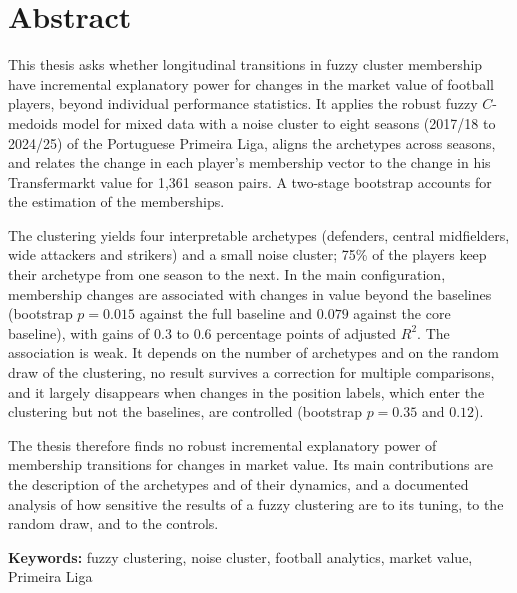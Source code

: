 \chapter*{Abstract}

This thesis asks whether longitudinal transitions in fuzzy cluster membership have incremental explanatory power for changes in the market value of football players, beyond individual performance statistics. It applies the robust fuzzy $C$-medoids model for mixed data with a noise cluster to eight seasons (2017/18 to 2024/25) of the Portuguese Primeira Liga, aligns the archetypes across seasons, and relates the change in each player's membership vector to the change in his Transfermarkt value for 1,361 season pairs. A two-stage bootstrap accounts for the estimation of the memberships.

The clustering yields four interpretable archetypes (defenders, central midfielders, wide attackers and strikers) and a small noise cluster; 75\% of the players keep their archetype from one season to the next. In the main configuration, membership changes are associated with changes in value beyond the baselines (bootstrap $p=0.015$ against the full baseline and $0.079$ against the core baseline), with gains of 0.3 to 0.6 percentage points of adjusted $R^2$. The association is weak. It depends on the number of archetypes and on the random draw of the clustering, no result survives a correction for multiple comparisons, and it largely disappears when changes in the position labels, which enter the clustering but not the baselines, are controlled (bootstrap $p=0.35$ and $0.12$).

The thesis therefore finds no robust incremental explanatory power of membership transitions for changes in market value. Its main contributions are the description of the archetypes and of their dynamics, and a documented analysis of how sensitive the results of a fuzzy clustering are to its tuning, to the random draw, and to the controls.

\bigskip\noindent\textbf{Keywords:} fuzzy clustering, noise cluster, football analytics, market value, Primeira Liga
\clearpage
